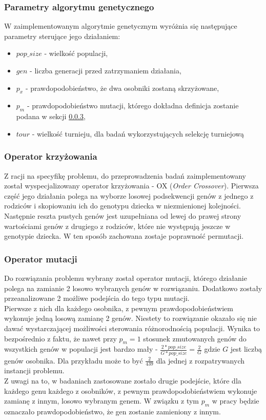 \documentclass{article}
\begin{document}
	\subsubsection{Parametry algorytmu genetycznego}
	W zaimplementowanym algorytmie genetycznym wyróżnia się następujące parametry sterujące jego działaniem:
	\begin{itemize}
		\item $pop\_size$ - wielkość populacji,
		\item $gen$ - liczba generacji przed zatrzymaniem działania,
		\item $p_x$ - prawdopodobieństwo, że dwa osobniki zostaną skrzyżowane,
		\item $p_m$ - prawdopodobieństwo mutacji, którego dokładna definicja zostanie podana w sekcji \ref{op:mutation},
		\item $tour$ - wielkość turnieju, dla badań wykorzystujących selekcję turniejową
	\end{itemize}
	
	\subsubsection{Operator krzyżowania}
	Z racji na specyfikę problemu, do przeprowadzenia badań zaimplementowany został wyspecjalizowany operator krzyżowania - OX (\textit{Order Crossover}). Pierwsza część jego działania polega na wyborze losowej podsekwencji genów z jednego z rodziców i skopiowaniu ich do genotypu dziecka w niezmienionej kolejności. Następnie reszta pustych genów jest uzupełniana od lewej do prawej strony wartościami genów z drugiego z rodziców, które nie występują jeszcze w genotypie dziecka. W ten sposób zachowana zostaje poprawność permutacji.
	
	\subsubsection{Operator mutacji}\label{op:mutation}
	Do rozwiązania problemu wybrany został operator mutacji, którego działanie polega na zamianie 2 losowo wybranych genów w rozwiązaniu. Dodatkowo zostały przeanalizowane 2 możliwe podejścia do tego typu mutacji.
	\\Pierwsze z nich dla każdego osobnika, z pewnym prawdopodobieństwiem wykonuje jedną losową zamianę 2 genów. Niestety to rozwiązanie okazało się nie dawać wystarczającej możliwości sterowania różnorodnością populacji. Wynika to bezpośrednio z faktu, że nawet przy $p_m = 1$ stosunek zmutowanych genów do wszystkich genów w populacji jest bardzo mały - $\tfrac{2 * pop\_size}{G * pop\_size} = \tfrac{2}{G}$ gdzie $G$ jest liczbą genów osobnika.
	Dla przykładu może to być $\tfrac{2}{439}$ dla jednej z rozpatrywanych instancji problemu.
	\\Z uwagi na to, w badaniach zastosowane zostało drugie podejście, które dla każdego genu każdego z osobników, z pewnym prawdopodobieństwiem wykonuje zamianę z innym, losowo wybranym genem. W związku z tym $p_m$ w pracy będzie oznaczało prawdopodobieństwo, że gen zostanie zamieniony z innym.
	
\end{document}
